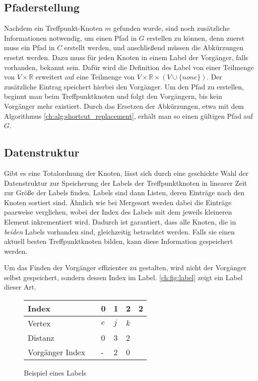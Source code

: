 \subsection{Pfaderstellung}

Nachdem ein Treffpunkt-Knoten $m$ gefunden wurde, sind noch zusätzliche Informationen notwendig, um einen Pfad in $G$ erstellen zu können, denn zuerst muss ein Pfad in $C$ erstellt werden, und anschließend müssen die Abkürzungen ersetzt werden.
Dazu muss für jeden Knoten in einem Label der Vorgänger, falls vorhanden, bekannt sein.
Dafür wird die Definition des Label von einer Teilmenge von $V \times \mathbb{R}$ erweitert auf eine Teilmenge von $V \times \mathbb{R} \times (V \cup \{ none \}) $.
Der zusätzliche Eintrag speichert hierbei den Vorgänger.
Um den Pfad zu erstellen, beginnt man beim Treffpunktknoten und folgt den Vorgängern, bis kein Vorgänger mehr existiert.
Durch das Ersetzen der Abkürzungen, etwa mit dem Algorithmus \ref{ch:alg:shortcut_replacement}, erhält man so einen gültigen Pfad auf $G$.

\subsection{Datenstruktur}

Gibt es eine Totalordnung der Knoten, lässt sich durch eine geschickte Wahl der Datenstruktur zur Speicherung der Labels der Treffpunktknoten in linearer Zeit zur Größe der Labels finden.
Labels sind dann Listen, deren Einträge nach den Knoten sortiert sind.
Ähnlich wie bei Mergesort werden dabei die Einträge paarweise verglichen, wobei der Index des Labels mit dem jeweils kleineren Element inkrementiert wird.
Dadurch ist garantiert, dass alle Knoten, die in \emph{beiden} Labels vorhanden sind, gleichzeitig betrachtet werden.
Falls sie einen aktuell besten Treffpunktknoten bilden, kann diese Information gespeichert werden.

Um das Finden der Vorgänger effizienter zu gestalten, wird nicht der Vorgänger selbst gespeichert, sondern dessen Index im Label.
\autoref{ch:fig:label} zeigt ein Label dieser Art.

\begin{figure}[ht]
  \centering
  \begin{tabular}{@{}llllll@{}}
    \toprule
    Index           &  & 0   & 1   & 2   & 2 \\ \midrule
    Vertex          &  & $e$ & $j$ & $k$ &   \\
    Distanz         &  & 0   & 3   & 2   &   \\
    Vorgänger Index &  & -   & 2   & 0   &   \\ \bottomrule
  \end{tabular}
  \caption{Beispiel eines Labels}
  \label{ch:fig:label}
\end{figure}

